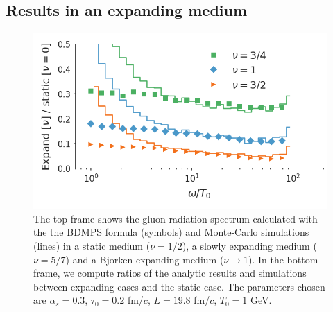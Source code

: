 \documentclass[aps, prc, reprint, amsmath, groupedaddress, nofootinbib]{revtex4-1}
\begin{document}
\subsection{Results in an expanding medium}
\begin{figure}
\includegraphics[width=\columnwidth]{spectrum_Bjorken.png}
\caption{The top frame shows the gluon radiation spectrum calculated with the the BDMPS formula (symbols) and Monte-Carlo simulations (lines) in a static medium ($\nu=1/2$), a slowly expanding medium ($\nu=5/7$) and a Bjorken expanding medium ($\nu\rightarrow 1$). In the bottom frame, we compute ratios of the analytic results and simulations between expanding cases and the static case. The parameters chosen are $\alpha_s=0.3$, $\tau_0 = 0.2$ fm/$c$, $L = 19.8$ fm/$c$, $T_0 = 1$ GeV.}
\label{fig:Bjorken-BDMPS}
\end{figure}
\end{document}
